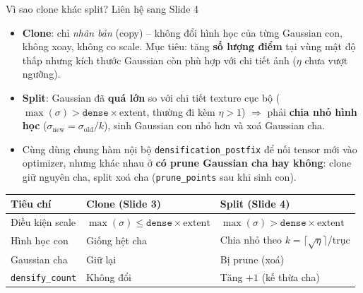 \begin{frame}{Vì sao clone khác split? Liên hệ sang Slide 4}
\footnotesize
\begin{itemize}
    \item \textbf{Clone}: chỉ \textit{nhân bản} (copy) -- không đổi hình học của từng Gaussian con, không xoay, không co scale. Mục tiêu: tăng \textbf{số lượng điểm} tại vùng mật độ thấp nhưng kích thước Gaussian còn phù hợp với chi tiết ảnh ($\eta$ chưa vượt ngưỡng).
    \item \textbf{Split}: Gaussian đã \textbf{quá lớn} so với chi tiết texture cục bộ ($\max(\sigma) > \texttt{dense}\times\text{extent}$, thường đi kèm $\eta > 1$) $\Rightarrow$ phải \textbf{chia nhỏ hình học} ($\sigma_{\text{new}} = \sigma_{\text{old}}/k$), sinh Gaussian con nhỏ hơn và xoá Gaussian cha.
    \item Cùng dùng chung hàm nội bộ \texttt{densification\_postfix} để nối tensor mới vào optimizer, nhưng khác nhau ở \textbf{có prune Gaussian cha hay không}: clone giữ nguyên cha, split xoá cha (\texttt{prune\_points} sau khi sinh con).
\end{itemize}
\vspace{0.2cm}
\small
\centering
\begin{tabular}{lll}
\toprule
\textbf{Tiêu chí} & \textbf{Clone (Slide 3)} & \textbf{Split (Slide 4)} \\
\midrule
Điều kiện scale & $\max(\sigma)\le\texttt{dense}\times\text{extent}$ & $\max(\sigma) > \texttt{dense}\times\text{extent}$ \\
Hình học con & Giống hệt cha & Chia nhỏ theo $k=\lceil\sqrt{\eta}\rceil$/trục \\
Gaussian cha & Giữ lại & Bị prune (xoá) \\
\texttt{densify\_count} & Không đổi & Tăng $+1$ (kế thừa cha) \\
\bottomrule
\end{tabular}
\end{frame}
